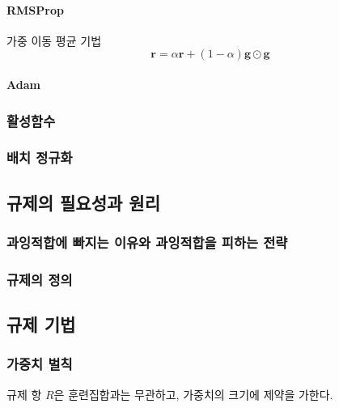 \documentclass [12pt] {oblivoir}
\let\oldsubsubsection=\subsubsection
\renewcommand{\subsubsection}
{
  \filbreak
  \oldsubsubsection
}
\begin{document}
\vspace{3mm}

\paragraph*{RMSProp}\mbox{}

가중 이동 평균 기법
\begin{equation} \tag{5.14}
  \mathbf{r} = \alpha \mathbf{r} + (1 - \alpha)\mathbf{g} \odot \mathbf{g}
\end{equation}

\vspace{3mm}

\paragraph*{Adam}\mbox{}

\vspace{3mm}

\subsubsection{활성함수}

\subsubsection{배치 정규화}

\subsection{규제의 필요성과 원리}

\subsubsection{과잉적합에 빠지는 이유와 과잉적합을 피하는 전략}

\subsubsection{규제의 정의}

\subsection{규제 기법}

\subsubsection{가중치 벌칙}
규제 항 $R$은 훈련집합과는 무관하고, 가중치의 크기에 제약을 가한다.
\end{document}
